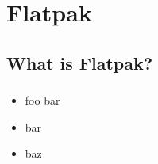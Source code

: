 %
%
%

\section{Flatpak}
\subsection{What is Flatpak?}

\begin{frame}
  \frametitle{\insertsubsection}

    \begin{itemize}
    \item foo bar
    \item bar
    \item baz
    \end{itemize}
\end{frame}
